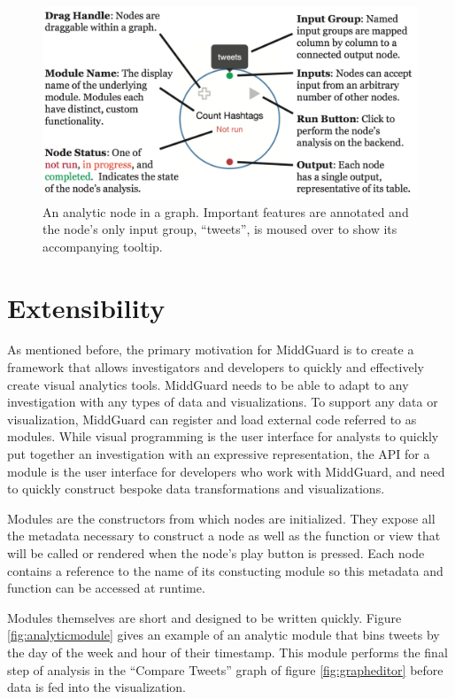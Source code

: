 \documentclass[midd]{thesis}
\begin{document}
\begin{figure}[!ht]
  \centering
  \includegraphics[width=1\textwidth]{middguard-analytic-node-annotated}
  \caption{An analytic node in a graph. Important features are annotated and the
  node's only input group, ``tweets'', is moused over to show its accompanying
  tooltip.}
  \label{fig:annotatednode}
\end{figure}

\section{Extensibility}

As mentioned before, the primary motivation for MiddGuard is to create a
framework that allows investigators and developers to quickly and effectively
create visual analytics tools. MiddGuard needs to be able to adapt to any
investigation with any types of data and visualizations. To support any data or
visualization, MiddGuard can register and load external code referred to as
modules. While visual programming is the user interface for analysts to quickly
put together an investigation with an expressive representation, the API for a
module is the user interface for developers who work with MiddGuard, and need to
quickly construct bespoke data transformations and visualizations.

Modules are the constructors from which nodes are initialized. They expose all
the metadata necessary to construct a node as well as the function or view that
will be called or rendered when the node's play button is pressed. Each node
contains a reference to the name of its constucting module so this metadata and
function can be accessed at runtime.

Modules themselves are short and designed to be written quickly. Figure
\ref{fig:analyticmodule} gives an example of an analytic module that bins tweets
by the day of the week and hour of their timestamp. This module performs the
final step of analysis in the ``Compare Tweets'' graph of figure
\ref{fig:grapheditor} before data is fed into the visualization.
\end{document}
